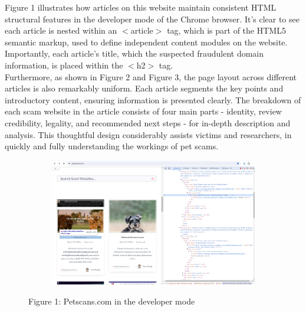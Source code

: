 \documentclass[ oneside,%
                    author={Cassie Qing Tang},
                    degree={BSc},
                     title={The Report for 3D Modelling of Queens Library \\ },
                    subtitle={ }]{dissertation}
\begin{document}
Figure 1 illustrates how articles on this website maintain consistent HTML structural features in the developer mode of the Chrome browser. It's clear to see each article is nested within an $<$article$>$ tag, which is part of the HTML5 semantic markup, used to define independent content modules on the website. Importantly, each article's title, which the suspected fraudulent domain information, is placed within the $<$h2$>$ tag. 
\\

Furthermore, as shown in Figure 2 and Figure 3, the page layout across different articles is also remarkably uniform. Each article segments the key points and introductory content, ensuring information is presented clearly. The breakdown of each scam website in the article consists of four main parts - identity, review credibility, legality, and recommended next steps - for in-depth description and analysis. This thoughtful design considerably assists victims and researchers, in quickly and fully understanding the workings of pet scams.
\begin{figure}[!htb]
    \centering
    \begin{subfigure}[b]{0.7\textwidth}
        \includegraphics[width=\linewidth,height=0.28\textheight]{pic/figure1.png}
        \label{fig:petscams}
    \end{subfigure}
    \caption{Figure 1: Petscans.com in the developer mode}
    \label{fig:main1}
\end{figure}
\end{document}
